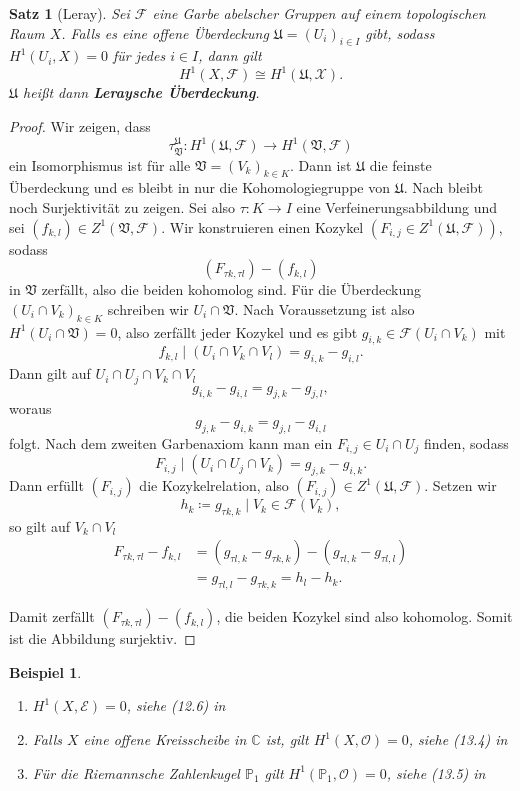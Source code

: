 \documentclass[11pt,a4paper,toc=bibliography]{scrartcl}
\theoremstyle{def}
\theoremstyle{thm}
\newtheorem{satz}[defi]{Satz}
\newtheorem{bsp}[defi]{Beispiel}
\theoremstyle{remark}
\begin{document}
\begin{satz}[Leray]
Sei $\mathcal{F}$ eine Garbe abelscher Gruppen auf einem topologischen Raum $X$. Falls es eine offene Überdeckung $\mathfrak{U}=(U_i)_{i\in I}$ gibt, sodass $H^1(U_i,X)=0$ für jedes $i\in I$, dann gilt
\[
H^1(X,\mathcal{F})\cong H^1(\mathfrak{U},\mathcal{X}).
\]
$\mathfrak{U}$ heißt dann \textbf{Leraysche Überdeckung}.
\end{satz}
\begin{proof}
	Wir zeigen, dass
	\[\tau_{\mathfrak{V}}^{\mathfrak{U}}:H^1(\mathfrak{U},\mathcal{F})\rightarrow H^1(\mathfrak{V},\mathcal{F})\]
	ein Isomorphismus ist für alle $\mathfrak{V}=(V_k)_{k\in K}$. Dann ist $\mathfrak{U}$ die feinste Überdeckung und es bleibt in  nur die Kohomologiegruppe von $\mathfrak{U}$. Nach  bleibt noch Surjektivität zu zeigen.
	Sei also $\tau : K\rightarrow I$ eine Verfeinerungsabbildung und sei $(f_{k,l})\in Z^1(\mathfrak{V},\mathcal{F}).$ Wir konstruieren einen Kozykel $(F_{i,j}\in Z^1(\mathfrak{U},\mathcal{F}))$, sodass \[(F_{\tau k,\tau l})-(f_{k,l})\]
	in $\mathfrak{V}$ zerfällt, also die beiden kohomolog sind.
	Für die Überdeckung $(U_i\cap V_k)_{k\in K}$ schreiben wir $U_i\cap\mathfrak{V}$. Nach Voraussetzung ist also $H^1(U_i\cap \mathfrak{V})=0$, also zerfällt jeder Kozykel und es gibt $g_{i,k}\in\mathcal{F}(U_i\cap V_k)$ mit
	\[f_{k,l}\mid (U_i\cap V_k\cap V_l)=g_{i,k}-g_{i,l}.
	\]
	Dann gilt auf $U_i\cap U_j\cap V_k\cap V_l$
	\[g_{i,k}-g_{i,l}=g_{j,k}-g_{j,l},
	\]
	woraus
	\[g_{j,k}-g_{i,k}=g_{j,l}-g_{i,l}
	\]
	folgt. Nach dem zweiten Garbenaxiom kann man ein $F_{i,j}\in U_i\cap U_j$ finden, sodass
	\[F_{i,j}\mid(U_i\cap U_j\cap V_k)= g_{j,k}-g_{i,k}.
	\]
	Dann erfüllt $(F_{i,j})$ die Kozykelrelation, also $(F_{i,j})\in Z^1(\mathfrak{U},\mathcal{F})$.
	Setzen wir \[h_{k}\coloneqq g_{\tau k, k}\mid V_k \in \mathcal{F}(V_k),\] so gilt auf $V_k\cap V_l$
	\begin{align*}
		F_{\tau k,\tau l} -f_{k,l}&=(g_{\tau l,k}-g_{\tau k,k})-(g_{\tau l,k}-g_{\tau l,l})\\
		&=g_{\tau l,l}-g_{\tau k, k}=h_l-h_k.
	\end{align*}
	
	Damit zerfällt $(F_{\tau k,\tau l})-(f_{k,l})$, die beiden Kozykel sind also kohomolog. Somit ist die Abbildung surjektiv.
\end{proof}

\begin{bsp}
\begin{enumerate}
    \item
    $H^1(X,\mathcal{E})=0$, siehe (12.6) in \cite[~S.92]{forster}
    \item
    Falls $X$ eine offene Kreisscheibe in $\mathbb{C}$ ist, gilt $H^1(X,\mathcal{O})=0$, siehe (13.4) in \cite[~S.98]{forster}
    \item
    Für die Riemannsche Zahlenkugel $\mathbb{P}_1$ gilt $H^1(\mathbb{P}_1,\mathcal{O})=0$, siehe (13.5) in \cite[~S.107]{forster}
\end{enumerate}
\end{bsp}
\end{document}
